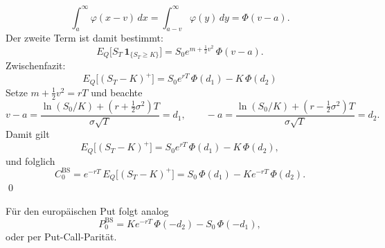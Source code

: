 \begin{satz}
$$
\int_a^\infty \varphi(x - v)\,dx = \int_{a-v}^\infty \varphi(y)\,dy = \Phi(v-a).
$$
Der zweite Term ist damit bestimmt:
$$
E_Q\big[S_T\,\mathbf 1_{\{S_T\ge K\}}\big]
= S_0 e^{m + \frac12 v^2}\,\Phi(v-a).
$$
Zwischenfazit:
$$
E_Q\big[(S_T - K)^+\big] = S_0 e^{rT}\,\Phi(d_1) - K\,\Phi(d_2)
$$
Setze $m+\tfrac12 v^2 = rT$ und beachte
$$
v-a = \frac{\ln(S_0/K) + (r+\tfrac12\sigma^2)T}{\sigma \sqrt{T}} = d_1,
\qquad
-a = \frac{\ln(S_0/K) + (r-\tfrac12\sigma^2)T}{\sigma \sqrt{T}} = d_2.
$$
Damit gilt
$$
E_Q\big[(S_T - K)^+\big]
= S_0 e^{rT}\,\Phi(d_1) - K\,\Phi(d_2),
$$
und folglich
$$
C_0^{\mathrm{BS}} = e^{-rT}\,E_Q\big[(S_T - K)^+\big]
= S_0\,\Phi(d_1) - K e^{-rT}\,\Phi(d_2).
$$
\qed
\end{satz}

\begin{bem}
Für den europäischen Put folgt analog
$$
P_0^{\mathrm{BS}} = K e^{-rT}\,\Phi(-d_2) - S_0\,\Phi(-d_1),
$$
oder per Put-Call-Parität.

\end{bem}

